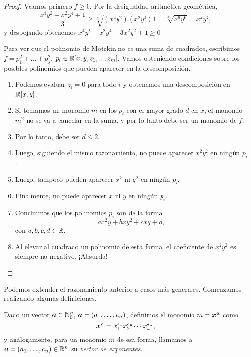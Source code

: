\begin{proof}
Veamos primero $f \ge 0$. Por la desigualdad aritmética-geométrica,
$$
\frac{x^4y^2 + x^2y^4 + 1}{3} \ge \sqrt[3]{(x^4y^2)(x^2y^4) 1} = \sqrt[3]{x^6y^6} = x^2y^2,
$$
y despejando obtenemos $x^4y^2 + x^2y^4 - 3x^2y^2+1 \ge 0$

Para ver que el polinomio de Motzkin no es una suma de cuadrados, 
escribimos $f = p_1^2 + \dots + p_s^2$, $p_i \in \mathbb{R}[x, y, z_1, ...,z_m]$. Vamos obteniendo condiciones sobre los posibles polinomios que pueden aparecer en la descomposición.

\begin{enumerate}
\item Podemos evaluar $z_i=0$ para todo $i$ y obtenemos una descomposición en $\mathbb{R}[x, y]$.
\item Si tomamos un monomio $m$ en los $p_i$ con el mayor grado $d$ en $x$, el monomio $m^2$ no se va a cancelar en la suma, y por lo tanto debe ser un monomio de $f$.
\item Por lo tanto, debe ser $d \le 2$.
\item Luego, siguiendo el mismo razonamiento, no puede aparecer $x^2y^2$ en ningún $p_i$.
\item Luego, tampoco pueden aparecer $x^2$ ni $y^2$ en ningún $p_i$.
\item Finalmente, no puede aparecer $x$ ni $y$ en ningún $p_i$.
\item Concluimos que los polinomios $p_i$ son de la forma
$$
a x^2y + b x y^2 + c xy + d,
$$
con $a, b, c, d \in \mathbb{R}$.
\item Al elevar al cuadrado un polinomio de esta forma, el coeficiente de $x^2y^2$ es siempre no-negativo. ¡Absurdo!
\end{enumerate}

\end{proof}


Podemos extender el razonamiento anterior a casos más generales. Comenzamos realizando algunas definiciones.

\begin{definition}
Dado un vector $\bm{a} \in \mathbb{N}_0^n$, $\bm{a} = (a_1, \dots, a_n)$, definimos el monomio $m = \bm{x}^{\bm{a}}$ como
$$
\bm{x}^{\bm{a}} = x_1^{a_1} x_2^{a_2} \cdots x_n^{a_n},
$$
y análogamente, para un monomio $m$ de esa forma, llamamos a $\bm{a} = (a_1, \dots, a_n) \in \mathbb{R}^n$ su \emph{vector de exponentes}.
\end{definition}

